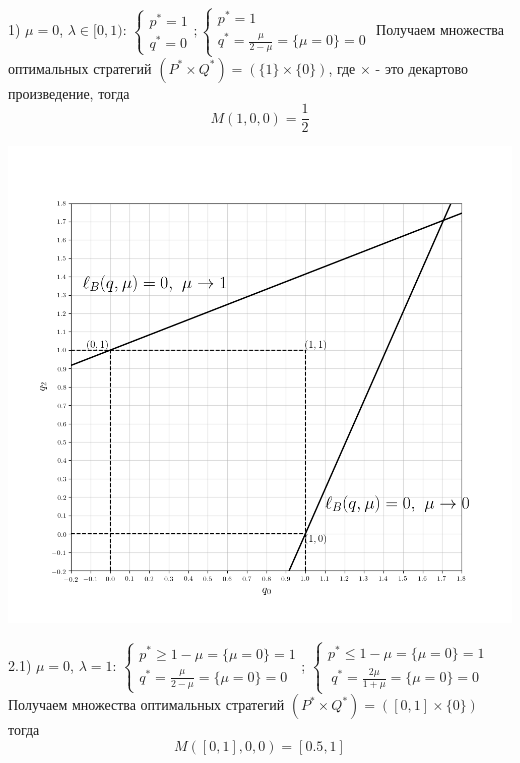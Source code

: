 \documentclass[letterpaper,12pt, reqno]{article}
\begin{document}
\begin{flushleft}
1) $\mu=0$, $\lambda \in [0, 1)$: 
$\begin{cases}p^{*}=1 \\ q^{*}=0 \end{cases};
\begin{cases}p^{*}=1 \\ q^{*}=\frac{\mu}{2-\mu} 
= \{\mu=0\}=0 \end{cases} $ \hfill \break
Получаем множества оптимальных стратегий 
$(P^{*} \times Q^{*}) =(\{1\} \times \{0\})$, где $\times$ - это декартово произведение, тогда
$$M(1,0,0)=\frac{1}{2}$$


\begin{center}
\includegraphics[scale=0.7]{graf_3_2}
\end{center}
2.1) $\mu=0$, $\lambda =1$: 
$\begin{cases}p^{*} \geq 1-\mu = \{\mu=0\}=1
\\ q^{*}=\frac{\mu}{2-\mu} = \{\mu=0\}=0
\end{cases}$;
$\begin{cases}p^{*} \leq 1-\mu = \{\mu=0\}=1\\\
q^{*}=\frac{2\mu}{1+\mu}= \{\mu=0\}=0 \end{cases}$
\hfill \break 
Получаем множества оптимальных стратегий 
$(P^{*} \times Q^{*}) =([0, 1] \times \{0\})$ тогда
$$M([0, 1],0,0)=[0.5,1]$$


\end{flushleft}
\end{document}
